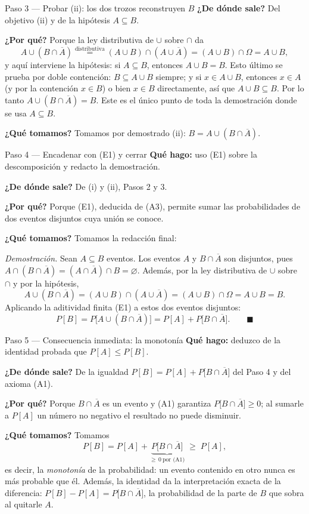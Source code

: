 \documentclass[11pt]{article}
\begin{document}
\begin{sol}
\begin{paso}{Paso 3 --- Probar (ii): los dos trozos reconstruyen $B$}
\textbf{¿De dónde sale?} Del objetivo (ii) y de la hipótesis $A\subseteq B$.

\textbf{¿Por qué?} Porque la ley distributiva de $\cup$ sobre $\cap$ da
\[
A\cup(B\cap\overline{A})
\overset{\text{distributiva}}{=}(A\cup B)\cap(A\cup\overline{A})
=(A\cup B)\cap\Omega
=A\cup B ,
\]
y aquí interviene la hipótesis: si $A\subseteq B$, entonces $A\cup B=B$. Esto último se prueba
por doble contención: $B\subseteq A\cup B$ siempre; y si $x\in A\cup B$, entonces $x\in A$ (y
por la contención $x\in B$) o bien $x\in B$ directamente, así que $A\cup B\subseteq B$. Por lo
tanto $A\cup(B\cap\overline{A})=B$. Este es el único punto de toda la demostración donde se usa
$A\subseteq B$.

\textbf{¿Qué tomamos?} Tomamos por demostrado (ii): $B=A\cup(B\cap\overline{A})$.
\end{paso}

\begin{paso}{Paso 4 --- Encadenar con (E1) y cerrar}
\textbf{Qué hago:} uso (E1) sobre la descomposición y redacto la demostración.

\textbf{¿De dónde sale?} De (i) y (ii), Pasos 2 y 3.

\textbf{¿Por qué?} Porque (E1), deducida de (A3), permite sumar las probabilidades de dos
eventos disjuntos cuya unión se conoce.

\textbf{¿Qué tomamos?} Tomamos la redacción final:

\medskip
\emph{Demostración.} Sean $A\subseteq B$ eventos. Los eventos $A$ y $B\cap\overline{A}$ son
disjuntos, pues $A\cap(B\cap\overline{A})=(A\cap\overline{A})\cap B=\varnothing$. Además, por la
ley distributiva de $\cup$ sobre $\cap$ y por la hipótesis,
\[
A\cup(B\cap\overline{A})=(A\cup B)\cap(A\cup\overline{A})=(A\cup B)\cap\Omega=A\cup B=B .
\]
Aplicando la aditividad finita (E1) a estos dos eventos disjuntos:
\[
P[B]=P\big[A\cup(B\cap\overline{A})\big]=P[A]+P\big[B\cap\overline{A}\big]. \qquad\blacksquare
\]
\end{paso}

\begin{paso}{Paso 5 --- Consecuencia inmediata: la monotonía}
\textbf{Qué hago:} deduzco de la identidad probada que $P[A]\le P[B]$.

\textbf{¿De dónde sale?} De la igualdad $P[B]=P[A]+P\big[B\cap\overline{A}\big]$ del Paso 4 y
del axioma (A1).

\textbf{¿Por qué?} Porque $B\cap\overline{A}$ es un evento y (A1) garantiza
$P\big[B\cap\overline{A}\big]\ge 0$; al sumarle a $P[A]$ un número no negativo el resultado no
puede disminuir.

\textbf{¿Qué tomamos?} Tomamos
\[
P[B]=P[A]+\underbrace{P\big[B\cap\overline{A}\big]}_{\ge\,0\ \text{por (A1)}}\;\ge\;P[A],
\]
es decir, la \emph{monotonía} de la probabilidad: un evento contenido en otro nunca es más
probable que él. Además, la identidad da la interpretación exacta de la diferencia:
$P[B]-P[A]=P\big[B\cap\overline{A}\big]$, la probabilidad de la parte de $B$ que sobra al
quitarle $A$.
\end{paso}

\end{sol}
\end{document}
